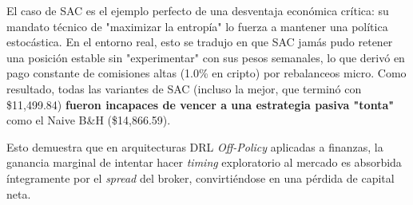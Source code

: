 \documentclass[12pt]{article}
\begin{document}
El caso de SAC es el ejemplo perfecto de una desventaja económica crítica: su mandato técnico de "maximizar la entropía" lo fuerza a mantener una política estocástica. En el entorno real, esto se tradujo en que SAC jamás pudo retener una posición estable sin "experimentar" con sus pesos semanales, lo que derivó en pago constante de comisiones altas (1.0\% en cripto) por rebalanceos micro. Como resultado, todas las variantes de SAC (incluso la mejor, que terminó con \$11,499.84) \textbf{fueron incapaces de vencer a una estrategia pasiva "tonta"} como el Naive B\&H (\$14,866.59). 

Esto demuestra que en arquitecturas DRL \textit{Off-Policy} aplicadas a finanzas, la ganancia marginal de intentar hacer \textit{timing} exploratorio al mercado es absorbida íntegramente por el \textit{spread} del broker, convirtiéndose en una pérdida de capital neta.
\end{document}
